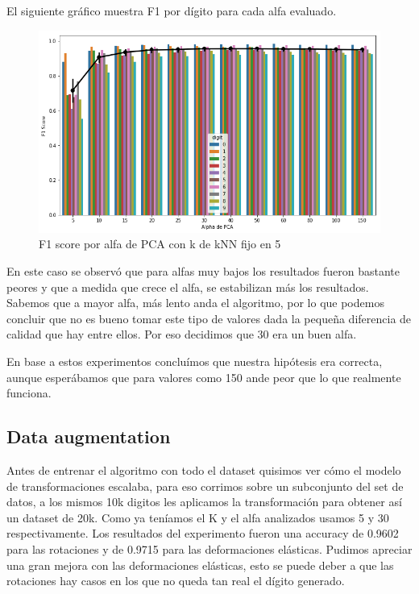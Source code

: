 El siguiente gráfico muestra F1 por dígito para cada alfa evaluado.

\begin{figure}[H]
    \begin{center}
      \includegraphics[width=0.8\columnwidth]{imagenes/F1_per_digit.png}
      \caption{F1 score por alfa de PCA con k de kNN fijo en 5}
    \end{center}
\end{figure}

En este caso se observó que para alfas muy bajos los resultados fueron bastante peores y que a medida que crece el alfa, se estabilizan más los resultados. 
Sabemos que a mayor alfa, más lento anda el algoritmo, por lo que podemos concluir que no es bueno tomar este tipo de valores dada la pequeña diferencia de calidad que hay entre ellos. Por eso decidimos que 30 era un buen alfa.

En base a estos experimentos concluímos que nuestra hipótesis era correcta, aunque esperábamos que para valores como 150 ande peor que lo que realmente funciona.

\subsection{Data augmentation}

Antes de entrenar el algoritmo con todo el dataset quisimos ver cómo el modelo de transformaciones escalaba, para eso corrimos sobre un subconjunto del set de datos, a los mismos 10k digitos les aplicamos la transformación para obtener así un dataset de 20k. Como ya teníamos el K y el alfa analizados usamos 5 y 30 respectivamente. Los resultados del experimento fueron una accuracy de 0.9602 para las rotaciones y de 0.9715 para las deformaciones elásticas. Pudimos apreciar una gran mejora con las deformaciones elásticas, esto se puede deber a que las rotaciones hay casos en los que no queda tan real el dígito generado.
